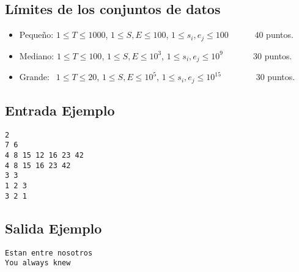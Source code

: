 \subsection*{Límites de los conjuntos de datos}

\begin{itemize}
    \item Pequeño: $ 1 \leq T \leq 1000 $, $ 1 \leq S, E
    \leq 100$, $1 \leq s_i, e_j \leq 100$   $\quad \;\;\;\;\;$ $40$ puntos.
    \item Mediano: $ 1 \leq T \leq 100 $, $ 1 \leq S, E
    \leq 10^{3}$, $1 \leq s_i, e_j \leq 10^9$   $\quad \;\;\; \quad$ $30$ puntos.
    \item Grande: $ \;\, 1 \leq T \leq 20$, $ 1 
    \leq S, E \leq 10^{5} $, $1 \leq s_i, e_j \leq 10^{15}$ $\quad \;\;\;\;\; \quad$ $30$ puntos.
\end{itemize}




\begin{multicols}{2}

\subsection*{Entrada Ejemplo}

\begin{verbatim}
2
7 6
4 8 15 12 16 23 42
4 8 15 16 23 42
3 3
1 2 3
3 2 1
\end{verbatim}

\columnbreak


\subsection*{Salida Ejemplo}

\begin{verbatim}
Estan entre nosotros
You always knew
\end{verbatim}

\end{multicols}